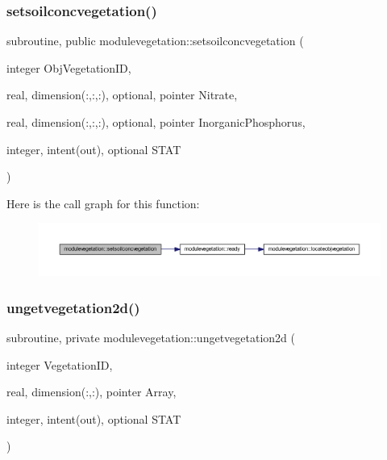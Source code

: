 \subsubsection{\texorpdfstring{setsoilconcvegetation()}{setsoilconcvegetation()}}
{\footnotesize\ttfamily subroutine, public modulevegetation\+::setsoilconcvegetation (\begin{DoxyParamCaption}\item[{integer}]{Obj\+Vegetation\+ID,  }\item[{real, dimension(\+:,\+:,\+:), optional, pointer}]{Nitrate,  }\item[{real, dimension(\+:,\+:,\+:), optional, pointer}]{Inorganic\+Phosphorus,  }\item[{integer, intent(out), optional}]{S\+T\+AT }\end{DoxyParamCaption})}

Here is the call graph for this function\+:\nopagebreak
\begin{figure}[H]
\begin{center}
\leavevmode
\includegraphics[width=350pt]{namespacemodulevegetation_a38d68bd81032a262aeb48e983401e19a_cgraph}
\end{center}
\end{figure}
\mbox{\label{namespacemodulevegetation_a2ffe279db4531dedb2c50c6349246a00}} 
\subsubsection{\texorpdfstring{ungetvegetation2d()}{ungetvegetation2d()}}
{\footnotesize\ttfamily subroutine, private modulevegetation\+::ungetvegetation2d (\begin{DoxyParamCaption}\item[{integer}]{Vegetation\+ID,  }\item[{real, dimension(\+:,\+:), pointer}]{Array,  }\item[{integer, intent(out), optional}]{S\+T\+AT }\end{DoxyParamCaption})\hspace{0.3cm}{\ttfamily [private]}}

